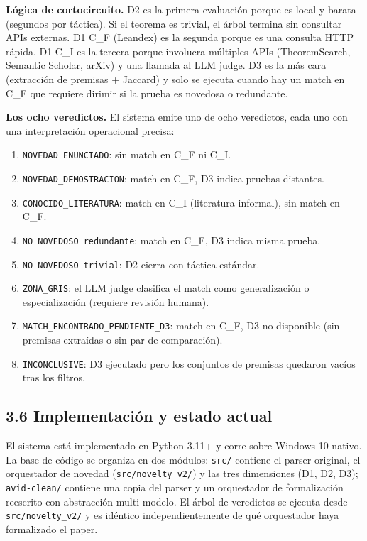 \documentclass[12pt,a4paper]{article}
\theoremstyle{remark}
\begin{document}
\textbf{Lógica de cortocircuito.} D2 es la primera evaluación porque es local y barata (segundos por táctica). Si el teorema es trivial, el árbol termina sin consultar APIs externas. D1 C\_F (Leandex) es la segunda porque es una consulta HTTP rápida. D1 C\_I es la tercera porque involucra múltiples APIs (TheoremSearch, Semantic Scholar, arXiv) y una llamada al LLM judge. D3 es la más cara (extracción de premisas + Jaccard) y solo se ejecuta cuando hay un match en C\_F que requiere dirimir si la prueba es novedosa o redundante.


\textbf{Los ocho veredictos.} El sistema emite uno de ocho veredictos, cada uno con una interpretación operacional precisa:

\begin{enumerate}
\item \texttt{NOVEDAD\_ENUNCIADO}: sin match en C\_F ni C\_I.
\item \texttt{NOVEDAD\_DEMOSTRACION}: match en C\_F, D3 indica pruebas distantes.
\item \texttt{CONOCIDO\_LITERATURA}: match en C\_I (literatura informal), sin match en C\_F.
\item \texttt{NO\_NOVEDOSO\_redundante}: match en C\_F, D3 indica misma prueba.
\item \texttt{NO\_NOVEDOSO\_trivial}: D2 cierra con táctica estándar.
\item \texttt{ZONA\_GRIS}: el LLM judge clasifica el match como generalización o especialización (requiere revisión humana).
\item \texttt{MATCH\_ENCONTRADO\_PENDIENTE\_D3}: match en C\_F, D3 no disponible (sin premisas extraídas o sin par de comparación).
\item \texttt{INCONCLUSIVE}: D3 ejecutado pero los conjuntos de premisas quedaron vacíos tras los filtros.
\end{enumerate}


\subsection{3.6 Implementación y estado actual}

El sistema está implementado en Python 3.11+ y corre sobre Windows 10 nativo. La base de código se organiza en dos módulos: \texttt{src/} contiene el parser original, el orquestador de novedad (\texttt{src/novelty\_v2/}) y las tres dimensiones (D1, D2, D3); \texttt{avid-clean/} contiene una copia del parser y un orquestador de formalización reescrito con abstracción multi-modelo. El árbol de veredictos se ejecuta desde \texttt{src/novelty\_v2/} y es idéntico independientemente de qué orquestador haya formalizado el paper.
\end{document}

